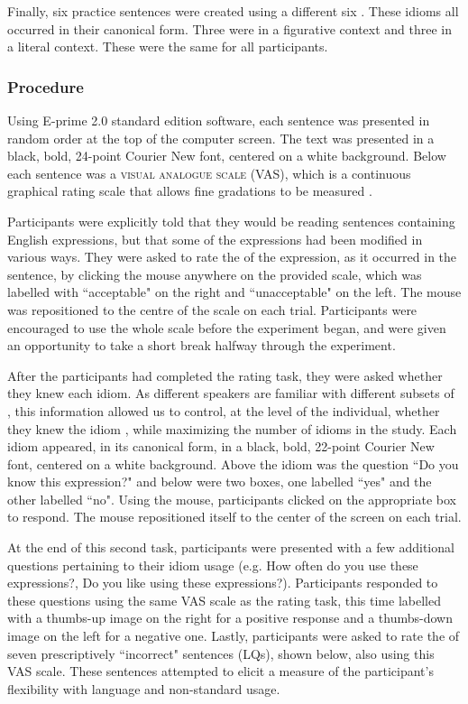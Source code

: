 \documentclass[output=paper
,modfonts
,nonflat]{langsci/langscibook}
\begin{document}
Finally, six practice sentences were created using a different six . These idioms all occurred in their canonical form. Three were in a figurative context and three in a literal context. These were the same for all participants. 


\subsubsection{Procedure}

Using E-prime 2.0 standard edition software, each sentence was presented in random order at the top of the computer screen. The text was presented in a black, bold, 24-point Courier New font, centered on a white background. Below each sentence was a \textsc{visual analogue scale} (VAS), which is a continuous graphical rating scale that allows fine gradations to be measured \citep{FunkeReips2012}. 

Participants were explicitly told that they would be reading sentences containing English expressions, but that some of the expressions had been modified in various ways. They were asked to rate the  of the expression, as it occurred in the sentence, by clicking the mouse anywhere on the provided scale, which was labelled with ``acceptable" on the right and ``unacceptable" on the left. The mouse was repositioned to the centre of the scale on each trial. Participants were encouraged to use the whole scale before the experiment began, and were given an opportunity to take a short break halfway through the experiment. 

After the participants had completed the rating task, they were asked whether they knew each idiom. As different speakers are familiar with different subsets of , this information allowed us to control, at the level of the individual, whether they knew the idiom \citep{Cacciari2005}, while maximizing the number of idioms in the study. Each idiom appeared, in its canonical form, in a black, bold, 22-point Courier New font, centered on a white background. Above the idiom was the question ``Do you know this expression?" and below were two boxes, one labelled ``yes" and the other labelled ``no". Using the mouse, participants clicked on the appropriate box to respond. The mouse repositioned itself to the center of the screen on each trial.

At the end of this second task, participants were presented with a few additional questions pertaining to their idiom  usage (e.g. How often do you use these expressions?, Do you like using these expressions?). Participants responded to these questions using the same VAS scale as the rating task, this time labelled with a thumbs-up image on the right for a positive response and a thumbs-down image on the left for a negative one. Lastly, participants were asked to rate the  of seven prescriptively ``incorrect" sentences (LQs), shown below, also using this VAS scale. These sentences attempted to elicit a measure of the participant's flexibility with language and non-standard usage.\\
\end{document}
